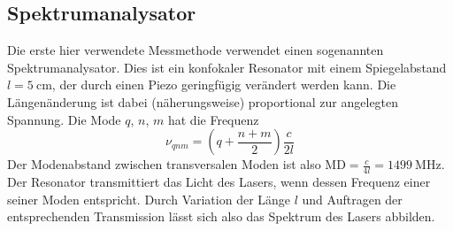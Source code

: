 \documentclass{article}
\newcommand{\mr}{\mathrm}
\begin{document}
\subsection{Spektrumanalysator}
Die erste hier verwendete Messmethode verwendet einen sogenannten Spektrumanalysator.
Dies ist ein konfokaler Resonator mit einem Spiegelabstand $l=\SI{5}{\cm}$, der durch einen Piezo geringfügig verändert werden kann.
Die Längenänderung ist dabei (näherungsweise) proportional zur angelegten Spannung.
Die Mode $q$, $n$, $m$ hat die Frequenz
\begin{equation}
  \nu_{qnm} = \left(q + \frac{n + m}{2}\right)\frac{c}{2l}
\end{equation}
Der Modenabstand zwischen transversalen Moden ist also $\mr{MD} = \frac{c}{4l} = \SI{1499}{\MHz}$.
Der Resonator transmittiert das Licht des Lasers, wenn dessen Frequenz einer seiner Moden entspricht.
Durch Variation der Länge $l$ und Auftragen der entsprechenden Transmission lässt sich also das Spektrum des Lasers abbilden.
\end{document}
